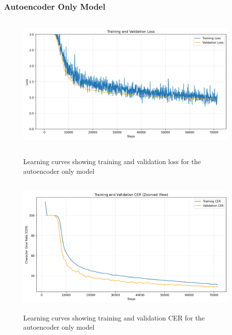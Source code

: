 \subsubsection{Autoencoder Only Model}
\begin{figure}[H]
    \centering
    \begin{minipage}{0.48\textwidth}
        \centering
        \includegraphics[height=7cm,width=\textwidth]{../results/model-autoencoder-tiny-new/loss_plot.png}
        \caption{Learning curves showing training and validation loss for the autoencoder only model}
        \label{fig:autoencoder_only_loss}
    \end{minipage}
    \hfill
    \begin{minipage}{0.48\textwidth}
        \centering
        \includegraphics[height=7cm, width=\textwidth]{../results/model-autoencoder-tiny-new/cer_zoomed_plot.png}
        \caption{Learning curves showing training and validation CER for the autoencoder only model}
        \label{fig:autoencoder_only_cer}
    \end{minipage}
\end{figure}

